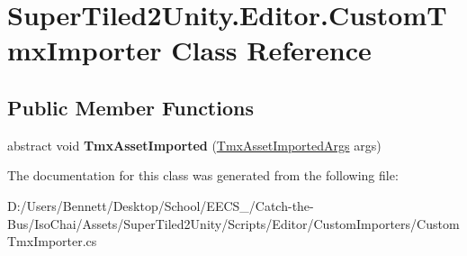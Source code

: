 \hypertarget{class_super_tiled2_unity_1_1_editor_1_1_custom_tmx_importer}{}\section{Super\+Tiled2\+Unity.\+Editor.\+Custom\+Tmx\+Importer Class Reference}
\label{class_super_tiled2_unity_1_1_editor_1_1_custom_tmx_importer}
\subsection*{Public Member Functions}
\begin{DoxyCompactItemize}
\item 
\mbox{\label{class_super_tiled2_unity_1_1_editor_1_1_custom_tmx_importer_af2b5c6b245fb9fec6d1fbdcd436e0261}} 
abstract void {\bfseries Tmx\+Asset\+Imported} (\mbox{\hyperlink{class_super_tiled2_unity_1_1_editor_1_1_tmx_asset_imported_args}{Tmx\+Asset\+Imported\+Args}} args)
\end{DoxyCompactItemize}


The documentation for this class was generated from the following file\+:\begin{DoxyCompactItemize}
\item 
D\+:/\+Users/\+Bennett/\+Desktop/\+School/\+E\+E\+C\+S\+\_/\+Catch-\/the-\/\+Bus/\+Iso\+Chai/\+Assets/\+Super\+Tiled2\+Unity/\+Scripts/\+Editor/\+Custom\+Importers/Custom\+Tmx\+Importer.\+cs\end{DoxyCompactItemize}
